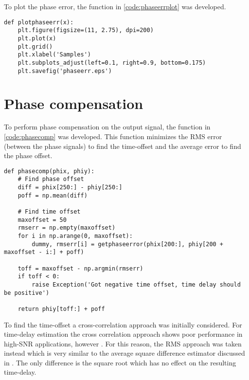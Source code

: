 To plot the phase error, the function in \cref{code:phaseerrplot} was developed.
\lstset{language=python,caption=Function for plotting phase errors,label=code:phaseerrplot}
\begin{lstlisting}
def plotphaseerr(x):
    plt.figure(figsize=(11, 2.75), dpi=200)  
    plt.plot(x)
    plt.grid()
    plt.xlabel('Samples')
    plt.subplots_adjust(left=0.1, right=0.9, bottom=0.175)
    plt.savefig('phaseerr.eps')  
\end{lstlisting}


\section{Phase compensation}
To perform phase compensation on the output signal, the function in \cref{code:phasecomp} was developed. This function minimizes the RMS error (between the phase signals) to find the time-offset and the average error to find the phase offset.\\

\lstset{language=python,caption=Function for performing phase compensation,label=code:phasecomp}
\begin{lstlisting}
def phasecomp(phix, phiy):
    # Find phase offset
    diff = phix[250:] - phiy[250:]
    poff = np.mean(diff)

    # Find time offset
    maxoffset = 50
    rmserr = np.empty(maxoffset)
    for i in np.arange(0, maxoffset):
        dummy, rmserr[i] = getphaseerror(phix[200:], phiy[200 + maxoffset - i:] + poff)

    toff = maxoffset - np.argmin(rmserr)
    if toff < 0:
        raise Exception('Got negative time offset, time delay should be positive')

    return phiy[toff:] + poff
\end{lstlisting}

\begin{sloppypar}
  To find the time-offset a cross-correlation approach was initially considered. For time-delay estimation the cross correlation approach shows poor performance in high-SNR applications, however \cite{193195}. For this reason, the RMS approach was taken instead which is very similar to the average square difference estimator discussed in \cite{193195}. The only difference is the square root which has no effect on the resulting time-delay.
\end{sloppypar}

